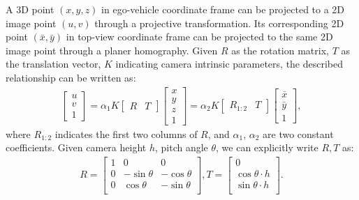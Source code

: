 \documentclass[10pt,twocolumn,letterpaper]{article}
\begin{document}
A 3D point $(x, y, z)$ in ego-vehicle coordinate frame can be projected to a 2D image point $(u, v)$ through a projective transformation. Its corresponding 2D point $(\bar{x}, \bar{y})$ in top-view coordinate frame can be projected to the same 2D image point through a planer homography. Given $R$ as the rotation matrix, $T$ as the translation vector, $K$ indicating camera intrinsic parameters, the described relationship can be written as: 
{\small
\begin{gather}
\label{eqn:geo}
    \begin{bmatrix} u \\ v \\ 1 \end{bmatrix}
     =
    \alpha_1 K
    \begin{bmatrix}
        R & T
    \end{bmatrix}
    \begin{bmatrix}
        x \\ y \\ z \\ 1
    \end{bmatrix}
    =
    \alpha_2 K
    \begin{bmatrix}
        R_{1:2} & T
    \end{bmatrix}
    \begin{bmatrix}
        \bar{x} \\ \bar{y} \\ 1
    \end{bmatrix},
\end{gather}
}
\noindent where $R_{1:2}$ indicates the first two columns of $R$, and $\alpha_1$, $\alpha_2$ are two constant coefficients. Given camera height $h$, pitch angle $\theta$, we can explicitly write $R, T$ as: 
{\small
\begin{gather}
    R
     =
    \begin{bmatrix}
        1 &             0 &             0\\
        0 & -\sin{\theta} & -\cos{\theta}\\
        0 &  \cos{\theta} & -\sin{\theta}\\
    \end{bmatrix},
    T =
    \begin{bmatrix}
        0 \\ \cos{\theta} \cdot h \\ \sin{\theta} \cdot h \\
    \end{bmatrix}.
\end{gather}
}
\end{document}
